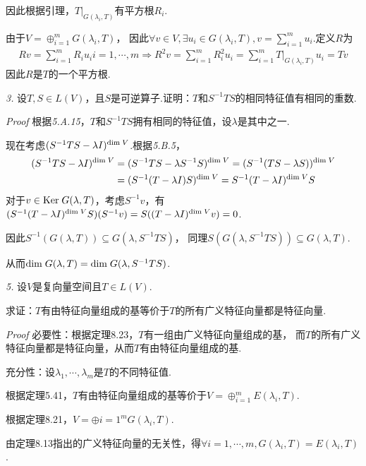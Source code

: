 因此根据引理，\(T|_{G(\lambda_i,T)}\)有平方根\(R_i\).

由于\(V=\oplus_{i=1}^m G(\lambda_i,T)\)，
因此\(\forall v \in V,\exists u_i \in G(\lambda_i,T),v=\sum_{i=1}^m u_i\).定义\(R\)为
    \begin{align*}
        Rv=\sum_{i=1}^m R_iu_i i=1,\cdots,m \Rightarrow
        R^2v=\sum_{i=1}^m R_i^2 u_i=\sum_{i=1}^m T|_{G(\lambda_i,T)}u_i=Tv
    \end{align*}
因此\(R\)是\(T\)的一个平方根.

\newpage

\textit{3.}
设\(T,S \in L(V)\)，且\(S\)是可逆算子.证明：\(T\)和\(S^{-1}TS\)的相同特征值有相同的重数.

\textit{Proof}
根据\textit{5.A.15}，\(T\)和\(S^{-1}TS\)拥有相同的特征值，设\(\lambda\)是其中之一.

现在考虑\((S^{-1}TS-\lambda I)^{\mathrm{dim \;} V}\).根据\textit{5.B.5}，
    \begin{align*}
        (S^{-1}TS-\lambda I)^{\mathrm{dim \;} V}&=(S^{-1}TS-\lambda S^{-1}S)^{\mathrm{dim \;} V}=(S^{-1}(TS-\lambda S))^{\mathrm{dim \;} V} \\
        &=(S^{-1}(T-\lambda I)S)^{\mathrm{dim \;} V}=S^{-1}(T-\lambda I)^{\mathrm{dim \;} V}S
    \end{align*}
对于\(v \in \mathrm{Ker \;} G(\lambda,T)\)，考虑\(S^{-1}v\)，有
\((S^{-1}(T-\lambda I)^{\mathrm{dim \;} V}S)(S^{-1}v)=S((T-\lambda I)^{\mathrm{dim \;} V}v)=0\).

因此\(S^{-1}(G(\lambda,T)) \subseteq G(\lambda,S^{-1}TS)\)，
同理\(S(G(\lambda,S^{-1}TS)) \subseteq G(\lambda,T)\).

从而\(\mathrm{dim \;} G(\lambda,T)=\mathrm{dim \;} G(\lambda,S^{-1}TS)\).

\hspace*{\fill}

\textit{5.}
设\(V\)是复向量空间且\(T \in L(V)\).

求证：\(T\)有由特征向量组成的基等价于\(T\)的所有广义特征向量都是特征向量.

\textit{Proof}
必要性：根据定理8.23，\(T\)有一组由广义特征向量组成的基，
而\(T\)的所有广义特征向量都是特征向量，从而\(T\)有由特征向量组成的基.

充分性：设\(\lambda_1,\cdots,\lambda_m\)是\(T\)的不同特征值.

根据定理5.41，\(T\)有由特征向量组成的基等价于\(V=\oplus_{i=1}^m E(\lambda_i,T)\).

根据定理8.21，\(V=\oplus{i=1}^m G(\lambda_i,T)\).

由定理8.13指出的广义特征向量的无关性，得\(\forall i=1,\cdots,m,G(\lambda_i,T)=E(\lambda_i,T)\).

